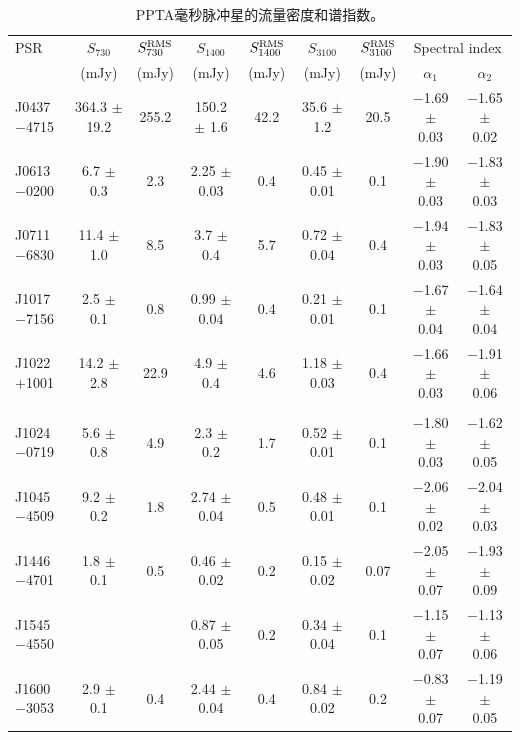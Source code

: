 \begin{landscape}
\begin{table}
\centering
\caption{PPTA毫秒脉冲星的流量密度和谱指数。}
\label{tableFlux}
\begin{tabular}{lcccccccc}
\hline
PSR              & $S_{730}$&$S^{\rm{RMS}}_{730}$&$S_{1400}$&$S^{\rm{RMS}}_{1400}$&$S_{3100}$&$S^{\rm{RMS}}_{3100}$& \multicolumn{2}{c}{Spectral index} \\
								 &  (mJy)   &    (mJy)           & (mJy)    &    (mJy)            &  (mJy)   &    (mJy)            &   $\alpha_{1}$ & $\alpha_{2}$ \\
\hline
 J0437$-$4715  &  364.3 $\pm$ 19.2 &  255.2 &  150.2 $\pm$ 1.6  &  42.2 &  35.6 $\pm$ 1.2  &  20.5  &  $-$1.69 $\pm$ 0.03 &  $-$1.65 $\pm$ 0.02 \\ 
 J0613$-$0200  &  6.7   $\pm$ 0.3  &  2.3   &  2.25  $\pm$ 0.03 &  0.4  &  0.45 $\pm$ 0.01 &  0.1   &  $-$1.90 $\pm$ 0.03 &  $-$1.83 $\pm$ 0.03 \\ 
 J0711$-$6830  &  11.4  $\pm$ 1.0  &  8.5   &  3.7   $\pm$ 0.4  &  5.7  &  0.72 $\pm$ 0.04 &  0.4   &  $-$1.94 $\pm$ 0.03 &  $-$1.83 $\pm$ 0.05 \\ 
 J1017$-$7156  &  2.5   $\pm$ 0.1  &  0.8   &  0.99  $\pm$ 0.04 &  0.4  &  0.21 $\pm$ 0.01 &  0.1   &  $-$1.67 $\pm$ 0.04 &  $-$1.64 $\pm$ 0.04 \\ 
 J1022$+$1001  &  14.2  $\pm$ 2.8  &  22.9  &  4.9   $\pm$ 0.4  &  4.6  &  1.18 $\pm$ 0.03 &  0.4   &  $-$1.66 $\pm$ 0.03 &  $-$1.91 $\pm$ 0.06 \\ 
               &	                 &        &                   &       &                  &        &                     &                     \\ 
 J1024$-$0719  &  5.6   $\pm$ 0.8  &  4.9   &  2.3   $\pm$ 0.2  &  1.7  &  0.52 $\pm$ 0.01 &  0.1   &  $-$1.80 $\pm$ 0.03 &  $-$1.62 $\pm$ 0.05 \\ 
 J1045$-$4509  &  9.2   $\pm$ 0.2  &  1.8   &  2.74  $\pm$ 0.04 &  0.5  &  0.48 $\pm$ 0.01 &  0.1   &  $-$2.06 $\pm$ 0.02 &  $-$2.04 $\pm$ 0.03 \\ 
 J1446$-$4701  &  1.8   $\pm$ 0.1  &  0.5   &  0.46  $\pm$ 0.02 &  0.2  &  0.15 $\pm$ 0.02 &  0.07  &  $-$2.05 $\pm$ 0.07 &  $-$1.93 $\pm$ 0.09 \\ 
 J1545$-$4550  &                   &        &  0.87  $\pm$ 0.05 &  0.2  &  0.34 $\pm$ 0.04 &  0.1   &  $-$1.15 $\pm$ 0.07 &  $-$1.13 $\pm$ 0.06 \\ 
 J1600$-$3053  &  2.9   $\pm$ 0.1  &  0.4   &  2.44  $\pm$ 0.04 &  0.4  &  0.84 $\pm$ 0.02 &  0.2   &  $-$0.83 $\pm$ 0.07 &  $-$1.19 $\pm$ 0.05 \\ 

\end{tabular}
\end{table}
\end{landscape}
